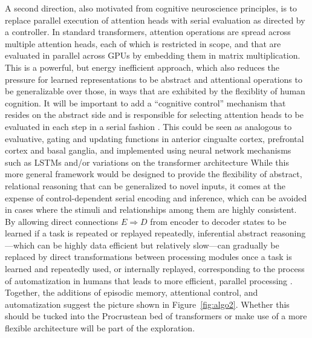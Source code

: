 A second direction, also motivated from cognitive neuroscience principles, is to replace 
parallel execution of attention heads with serial evaluation as directed by a controller. 
In standard transformers, attention operations are spread across multiple attention heads,
each of which is restricted in scope, and that are evaluated in parallel across GPUs by embedding them in matrix
multiplication. This is a powerful, but energy inefficient approach, which also reduces the pressure for learned
representations to be abstract and attentional operations to be generalizable over those, in ways that are exhibited
by the flexiblity of human cognition.  It will be important to add a ``cognitive control'' mechanism that resides on
the abstract side and is responsible for selecting attention heads to be evaluated in each step in a serial fashion \cite{cohen2017cognitive}.  This could be seen as analogous to evaluative, gating and updating functions in anterior cingualte cortex, prefrontal cortex and basal ganglia,
and implemented using neural network mechanisms such as LSTMs \cite{lstm} and/or variations on the transformer
architecture
While this more general framework would be designed to provide the flexibility of abstract, relational reasoning that
can be generalized to novel inputs, it comes at the expense of control-dependent serial encoding and inference, which can be avoided in cases where the stimuli and relationships among them are highly consistent. By allowing
direct connections $E \Rightarrow D$ from encoder to decoder states to be learned if a task is repeated or replayed
repeatedly, inferential abstract reasoning---which can be highly data efficient but relatively slow---can gradually
be replaced by direct transformations between processing modules once a task is learned and repeatedly used, or
internally replayed, corresponding to the process of automatization in humans that leads to more efficient, parallel
processing \cite{schneider1977controlled, ravi2020navigatingm, usslick2021rationalizing}.  Together, the additions of
episodic memory, attentional control, and automatization suggest the picture shown in Figure~\ref{fig:algo2}. Whether
this should be tucked into the Procrustean bed of transformers or make use of a more flexible architecture will be part of the exploration.


